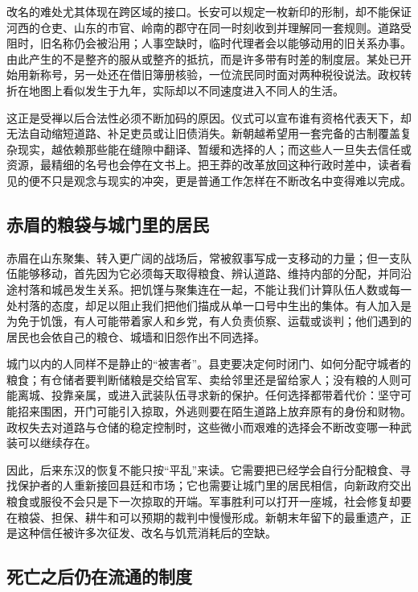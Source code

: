 改名的难处尤其体现在跨区域的接口。长安可以规定一枚新印的形制，却不能保证河西的仓吏、山东的市官、岭南的郡守在同一时刻收到并理解同一套规则。道路受阻时，旧名称仍会被沿用；人事空缺时，临时代理者会以能够动用的旧关系办事。由此产生的不是整齐的服从或整齐的抵抗，而是许多带有时差的制度层。某处已开始用新称号，另一处还在借旧簿册核验，一位流民同时面对两种税役说法。政权转折在地图上看似发生于九年，实际却以不同速度进入不同人的生活。

这正是受禅以后合法性必须不断加码的原因。仪式可以宣布谁有资格代表天下，却无法自动缩短道路、补足吏员或让旧债消失。新朝越希望用一套完备的古制覆盖复杂现实，越依赖那些能在缝隙中翻译、暂缓和选择的人；而这些人一旦失去信任或资源，最精细的名号也会停在文书上。把王莽的改革放回这种行政时差中，读者看见的便不只是观念与现实的冲突，更是普通工作怎样在不断改名中变得难以完成。

\subsection{赤眉的粮袋与城门里的居民}

赤眉在山东聚集、转入更广阔的战场后，常被叙事写成一支移动的力量；但一支队伍能够移动，首先因为它必须每天取得粮食、辨认道路、维持内部的分配，并同沿途村落和城邑发生关系。把饥馑与聚集连在一起，不能让我们计算队伍人数或每一处村落的态度，却足以阻止我们把他们描成从单一口号中生出的集体。有人加入是为免于饥饿，有人可能带着家人和乡党，有人负责侦察、运载或谈判；他们遇到的居民也会依自己的粮仓、城墙和旧怨作出不同选择。

城门以内的人同样不是静止的“被害者”。县吏要决定何时闭门、如何分配守城者的粮食；有仓储者要判断储粮是交给官军、卖给邻里还是留给家人；没有粮的人则可能离城、投靠亲属，或进入武装队伍寻求新的保护。任何选择都带着代价：坚守可能招来围困，开门可能引入掠取，外逃则要在陌生道路上放弃原有的身份和财物。政权失去对道路与仓储的稳定控制时，这些微小而艰难的选择会不断改变哪一种武装可以继续存在。

因此，后来东汉的恢复不能只按“平乱”来读。它需要把已经学会自行分配粮食、寻找保护者的人重新接回县廷和市场；它也需要让城门里的居民相信，向新政府交出粮食或服役不会只是下一次掠取的开端。军事胜利可以打开一座城，社会修复却要在粮袋、担保、耕牛和可以预期的裁判中慢慢形成。新朝末年留下的最重遗产，正是这种信任被许多次征发、改名与饥荒消耗后的空缺。

\subsection{死亡之后仍在流通的制度}

